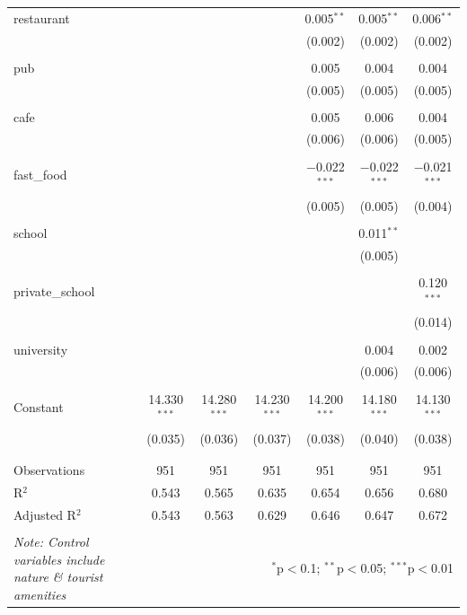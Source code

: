 \documentclass{article}
\begin{document}
\begin{table}[H]
\begin{tabular}{@{\extracolsep{-10pt}}lcccccc}
 restaurant &  &  &  & 0.005$^{**}$ & 0.005$^{**}$ & 0.006$^{**}$ \\ 
  &  &  &  & (0.002) & (0.002) & (0.002) \\ 
  & & & & & & \\ 
 pub &  &  &  & 0.005 & 0.004 & 0.004 \\ 
  &  &  &  & (0.005) & (0.005) & (0.005) \\ 
  & & & & & & \\ 
 cafe &  &  &  & 0.005 & 0.006 & 0.004 \\ 
  &  &  &  & (0.006) & (0.006) & (0.005) \\ 
  & & & & & & \\ 
 fast\_food &  &  &  & $-$0.022$^{***}$ & $-$0.022$^{***}$ & $-$0.021$^{***}$ \\ 
  &  &  &  & (0.005) & (0.005) & (0.004) \\ 
  & & & & & & \\ 
 school &  &  &  &  & 0.011$^{**}$ &  \\ 
  &  &  &  &  & (0.005) &  \\ 
  & & & & & & \\ 
 private\_school &  &  &  &  &  & 0.120$^{***}$ \\ 
  &  &  &  &  &  & (0.014) \\ 
  & & & & & & \\ 
 university &  &  &  &  & 0.004 & 0.002 \\ 
  &  &  &  &  & (0.006) & (0.006) \\ 
  & & & & & & \\ 
 Constant & 14.330$^{***}$ & 14.280$^{***}$ & 14.230$^{***}$ & 14.200$^{***}$ & 14.180$^{***}$ & 14.130$^{***}$ \\ 
  & (0.035) & (0.036) & (0.037) & (0.038) & (0.040) & (0.038) \\ 
  & & & & & & \\ 
\hline \\[-1.8ex] 
Observations & 951 & 951 & 951 & 951 & 951 & 951 \\ 
R$^{2}$ & 0.543 & 0.565 & 0.635 & 0.654 & 0.656 & 0.680 \\ 
Adjusted R$^{2}$ & 0.543 & 0.563 & 0.629 & 0.646 & 0.647 & 0.672 \\ 
\hline 
\hline \\[-1.8ex] 
\textit{Note: Control variables include nature \& tourist amenities}  & \multicolumn{6}{r}{$^{*}$p$<$0.1; $^{**}$p$<$0.05; $^{***}$p$<$0.01} \\ 
\end{tabular} 
\end{table} 
\end{document}
